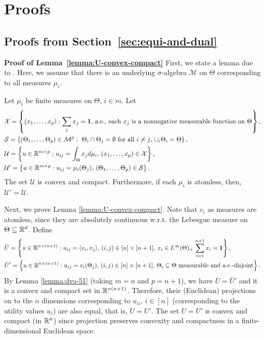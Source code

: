 
\section{Proofs} \label{app:proofs}

\subsection{Proofs from Section~\ref{sec:equi-and-dual}}
	\noindent\textbf{Proof of Lemma~\ref{lemma:U-convex-compact}}
	First, we state a lemma due to \citet[Theorems 1 and 4]{dvoretzky1951relations}. Here, we assume that there is an underlying $\sigma$-algebra $\mathcal{M}$ on $\Theta$ corresponding to all measures $\mu_i$.
	\begin{lemma}
		Let $\mu_i$ be finite measures on $\Theta$, $i\in m$. 
		Let 
		\begin{align*}
			& \mathcal{X} = \left\{ (x_1, \dots, x_p): \sum_j x_j = \mathbf{1}, \, \textnormal{a.e.},\, \text{each $x_j$ is a nonnegative measurable function on $\Theta$} \right\}, \\
			& \mathcal{S} = \left\{ (\Theta_1, \dots, \Theta_p) \in \mathcal{M}^p: \text{ $\Theta_i \cap \Theta_j = \emptyset$ for all $i\neq j$, $\cup_i \Theta_i = \Theta$}\right\},\\
			& \mathcal{U} = \left\{ u\in \mathbb{R}^{m\times p}: u_{ij} = \int_{\Theta} x_j d\mu_i,\, (x_1, \dots, x_p)\in\mathcal{X} \right\}, \\
			& \mathcal{U}' = \left\{ u\in \mathbb{R}^{m\times p}: u_{ij} = \mu_i(\Theta_j),\, (\Theta_1, \dots, \Theta_p) \in \mathcal{S} \right\}.
		\end{align*}
		The set $\mathcal{U}$ is convex and compact. Furthermore, if each $\mu_i$ is atomless, then, $\mathcal{U}' = \mathcal{U}$.
		\label{lemma:dvo-51}
	\end{lemma}

	Next, we prove Lemma \ref{lemma:U-convex-compact}.
	Note that $v_i$ as measures are atomless, since they are absolutely continuous w.r.t. the Lebesgue measure on $\Theta\subseteq \mathbb{R}^d$.
	Define 
	\begin{align*}
		& \bar{U} = \left\{ u \in \mathbb{R}^{n\times (n+1)}: u_{ij} = \langle v_i, x_j\rangle,\, (i,j)\in [n]\times [n+1],\, x_i \in L^\infty(\Theta)_+\, \sum_{i=1}^{n+1} x_i = \mathbf{1} \right\}, \\ 
		& \bar{U}' = \left\{ u \in \mathbb{R}^{n\times (n+1)}: u_{ij} = v_i(\Theta_j),\, (i,j)\in [n]\times [n+1],\, \textnormal{$\Theta_i\subseteq \Theta$ measurable and a.e.-disjoint}\right\}.
	\end{align*}
	By Lemma \ref{lemma:dvo-51} (taking $m=n$ and $p=n+1$), we have $\bar{U} = \bar{U}'$
	and it is a convex and compact set in $\mathbb{R}^{n(n+1)}$.
	Therefore, their (Euclidean) projections on to the $n$ dimensions corresponding to $u_{ii}$, $i\in [n]$ (corresponding to the utility values $u_i$) are also equal, that is, 
	$U = U'$.
	The set $U=U'$ is convex and compact (in $\mathbb{R}^n$) since projection preserves convexity and compactness in a finite-dimensional Euclidean space.


